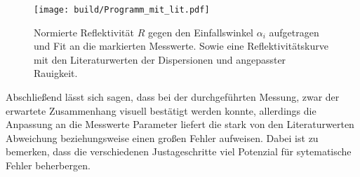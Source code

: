 \FloatBarrier
\begin{figure}
 \centering
   \texttt{[image: build/Programm\_mit\_lit.pdf]}
   \caption{Normierte Reflektivität $R$ gegen den Einfallswinkel $\alpha_i$ aufgetragen und
    Fit an die markierten Messwerte. Sowie eine Reflektivitätskurve mit den Literaturwerten der Dispersionen und angepasster Rauigkeit.}
   \label{fig:messung}
\end{figure}
\FloatBarrier

Abschließend lässt sich sagen, dass bei der durchgeführten Messung, zwar
der erwartete Zusammenhang visuell bestätigt werden konnte, allerdings die
Anpassung an die Messwerte Parameter liefert die stark von den Literaturwerten
Abweichung beziehungsweise einen großen Fehler aufweisen.
Dabei ist zu bemerken, dass die verschiedenen Justageschritte viel Potenzial
für sytematische Fehler beherbergen.











%
%
